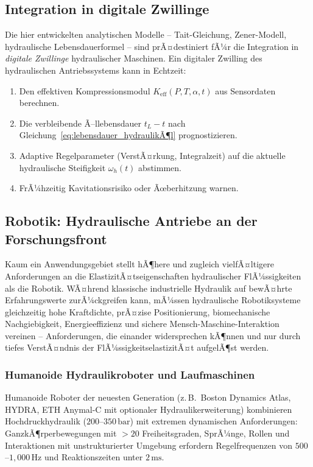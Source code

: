 ﻿\documentclass[a4paper,12pt]{scrreprt}
\theoremstyle{definition}
\begin{document}
\subsection{Integration in digitale Zwillinge}
\label{sec:ausblick_dz}

Die hier entwickelten analytischen Modelle -- Tait-Gleichung, Zener-Modell,
hydraulische Lebensdauerformel -- sind prÃ¤destiniert fÃ¼r die Integration
in \emph{digitale Zwillinge} hydraulischer Maschinen. Ein digitaler
Zwilling des hydraulischen Antriebssystems kann in Echtzeit:
\begin{enumerate}
  \item Den effektiven Kompressionsmodul $K_{\mathrm{eff}}(P, T, \alpha, t)$
    aus Sensordaten berechnen.
  \item Die verbleibende Ã–llebensdauer $t_L - t$ nach
    Gleichung~\eqref{eq:lebensdauer_hydraulikÃ¶l} prognostizieren.
  \item Adaptive Regelparameter (VerstÃ¤rkung, Integralzeit) auf die
    aktuelle hydrau\-lische Steifigkeit $\omega_h(t)$ abstimmen.
  \item FrÃ¼hzeitig Kavitationsrisiko oder Ãœberhitzung warnen.
\end{enumerate}

\subsection{Robotik: Hydraulische Antriebe an der Forschungsfront}

Kaum ein Anwendungsgebiet stellt hÃ¶here und zugleich vielfÃ¤ltigere
Anforderungen an die ElastizitÃ¤tseigenschaften hydraulischer FlÃ¼ssig\-keiten
als die Robotik. WÃ¤hrend klassische industrielle Hydraulik auf
bewÃ¤hrte Erfahrungswerte zurÃ¼ckgreifen kann, mÃ¼ssen hydraulische
Robotiksysteme gleichzeitig hohe Kraftdichte, prÃ¤zise Positionierung,
biomechanische Nachgiebigkeit, Energieeffizienz und sichere
Mensch-Maschine-Interaktion vereinen -- Anforderungen, die einander
widersprechen kÃ¶nnen und nur durch tiefes VerstÃ¤ndnis der
FlÃ¼ssigkeitselastizitÃ¤t aufgelÃ¶st werden.

\subsubsection{Humanoide Hydraulikroboter und Laufmaschinen}

Humanoide Roboter der neuesten Generation (z.\,B.\ Boston Dynamics Atlas,
HYDRA, ETH Anymal-C mit optionaler Hydraulikerweiterung) kombinieren
Hochdruckhydraulik ($200$--$350\,\mathrm{bar}$) mit extremen dynamischen
Anforderungen: GanzkÃ¶rperbewegungen mit $>20$ Freiheitsgraden,
SprÃ¼nge, Rol\-len und Interaktionen mit unstrukturierter Umgebung
erfordern Regelfrequenzen von $500$--$1{,}000\,\mathrm{Hz}$ und
Reaktionszeiten unter $2\,\mathrm{ms}$.
\end{document}
